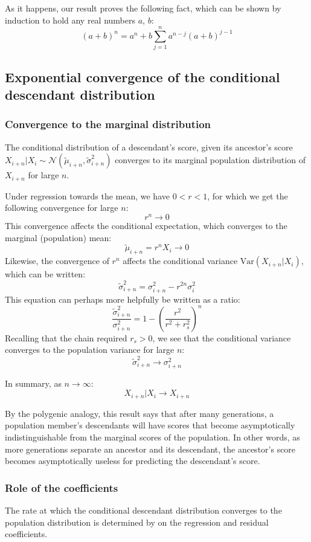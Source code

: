 \documentclass[letterpaper,10pt]{article} %
\begin{document}
As it happens, our result proves the following fact, which can be shown by induction to hold any real numbers $a$,  $b$:
$$(a+b)^n = a^n + b \sum_{j=1}^{n}a^{n-j}(a+b)^{j-1}$$




\subsection{Exponential convergence of the conditional descendant distribution}

\subsubsection*{Convergence to the marginal distribution}
The conditional distribution of a descendant's score, given its ancestor's score $X_{i+n}|X_i \sim \mathcal{N}( \tilde{\mu}_{i+n}, \tilde{\sigma}_{i+n}^2)$ converges to its marginal population distribution of $X_{i+n}$ for large $n$.

Under regression towards the mean, we have $0 < r < 1$, for which we get the following convergence for large $n$:
$$r^n \rightarrow 0$$
This convergence affects the conditional expectation, which converges to the marginal (population) mean:
$$\tilde{\mu}_{i+n} = r^nX_i \rightarrow 0$$
Likewise, the convergence of $r^n$ affects the conditional variance $\mathrm{Var}(X_{i+n}|X_i)$, which can be written:
$$\tilde{\sigma}_{i+n}^2 = \sigma_{i+n}^2 - r^{2n} \sigma_i^2$$
This equation can perhaps more helpfully be written as a ratio:
$$\frac{\tilde{\sigma}_{i+n}^2}{\sigma_{i+n}^2} = 1 - (\frac{r^2}{r^2+r_s^2})^n$$
Recalling that the chain required $r_s > 0$, we see that the conditional variance converges to the population variance for large $n$:
$$\tilde{\sigma}_{i+n}^2 \rightarrow \sigma_{i+n}^2$$

In summary, as $n \rightarrow \infty$:
$$X_{i+n}|X_i \rightarrow X_{i+n}$$

By the polygenic analogy, this result says that after many generations, a population member's descendants will have scores that become asymptotically indistinguishable from the marginal scores of the population. In other words, as more generations separate an ancestor and its descendant, the ancestor's score becomes asymptotically useless for predicting the descendant's score.


\subsubsection*{Role of the coefficients}
The rate at which the conditional descendant distribution converges to the population distribution is determined by on the regression and residual coefficients. 
\end{document}
